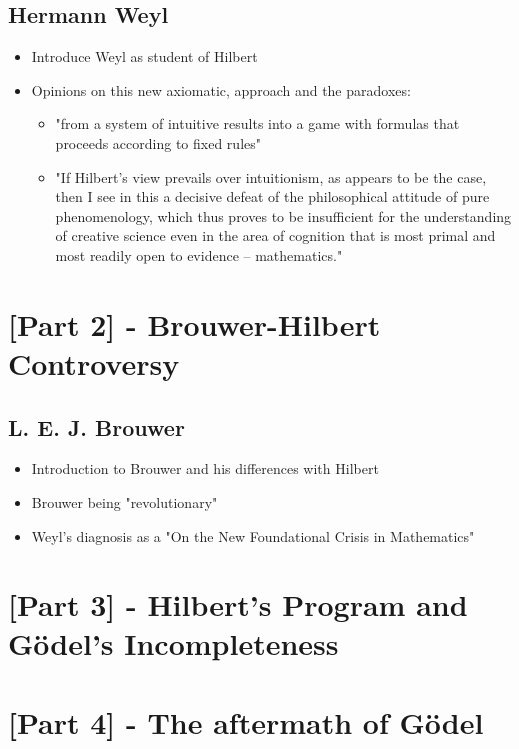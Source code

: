 \subsection{Hermann Weyl}

\begin{itemize}
    \item Introduce Weyl as student of Hilbert
    \item Opinions on this new axiomatic, approach and the paradoxes:
    \begin{itemize}
        \item "from a system of intuitive results into a game with formulas that proceeds according to fixed rules"
        \item  "If Hilbert's view prevails over intuitionism, as appears to be the case, then I see in this a decisive defeat of the philosophical attitude of pure phenomenology, which thus proves to be insufficient for the understanding of creative science even in the area of cognition that is most primal and most readily open to evidence – mathematics." 
    \end{itemize}
\end{itemize}

\section{[Part 2] - Brouwer-Hilbert Controversy}

\subsection{L. E. J. Brouwer}

\begin{itemize}
    \item Introduction to Brouwer and his differences with Hilbert
    \item Brouwer being "revolutionary"
    \item Weyl's diagnosis as a "On the New Foundational Crisis in Mathematics"
\end{itemize}

\section{[Part 3] - Hilbert's Program and G\"odel's Incompleteness}

\section{[Part 4] - The aftermath of G\"odel}

